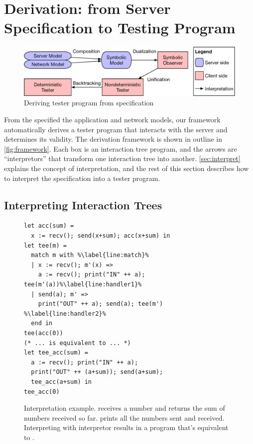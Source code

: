 \section{Derivation: from Server Specification to Testing Program}
\label{sec:derivation}
\begin{figure}
  \includegraphics[width=\linewidth]{figures/framework}
  \caption{Deriving tester program from specification}
  \label{fig:framework}
\end{figure}
From the specified the application and network models,
our framework automatically derives a tester program that
interacts with the server and determines its validity.  The derivation framework
is shown in outline in \autoref{fig:framework}.  Each box is an interaction tree
program, and the arrows are
``interpretors'' that transform one interaction tree into another.
\autoref{sec:interpret} explains the concept of interpretation, and the rest of
this section describes how to interpret the specification into a tester program.

\subsection{Interpreting Interaction Trees}
\label{sec:interpret}

\begin{figure}
  \begin{lstlisting}[style=customcoq,numbers=right,escapechar=\%]
let acc(sum) =
  x := recv(); send(x+sum); acc(x+sum) in
let tee(m) =
  match m with %\label{line:match}%
  | x := recv(); m'(x) =>
    a := recv(); print("IN" ++ a); tee(m'(a))%\label{line:handler1}%
  | send(a); m' =>
    print("OUT" ++ a); send(a); tee(m') %\label{line:handler2}%
  end in
tee(acc(0))
(* ... is equivalent to ... *)
let tee_acc(sum) =
  a := recv(); print("IN" ++ a);
  print("OUT" ++ (a+sum)); send(a+sum);
  tee_acc(a+sum) in
tee_acc(0)
  \end{lstlisting}
  \caption{Interpretation example.   receives a number and returns the
    sum of numbers received so far.   prints all the numbers sent and
    received.  Interpreting  with interpretor  results in a
    program that's equivalent to .}
  \label{fig:logger}
\end{figure}

